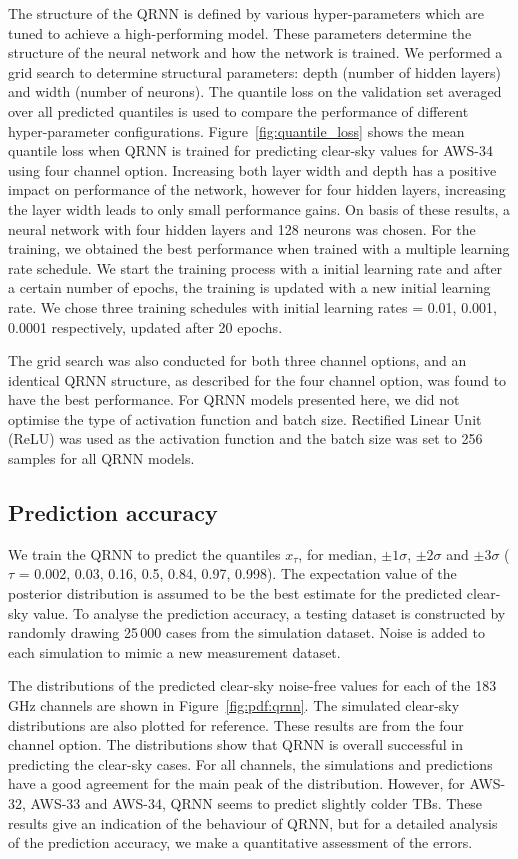 \documentclass[12pt]{article}
\begin{document}
The structure of the QRNN is defined by various hyper-parameters which are
tuned to achieve a high-performing model. These parameters determine the
structure of the neural network and how the network is trained. We performed a
grid search to determine structural parameters: depth (number of hidden layers)
and width (number of neurons). The quantile loss on the validation set averaged
over all predicted quantiles is used to compare the performance of different
hyper-parameter configurations. Figure~\ref{fig:quantile_loss} shows the mean
quantile loss when QRNN is trained for predicting clear-sky values for AWS-34
using four channel option. Increasing both layer width and depth has a positive
impact on performance of the network, however for four hidden layers,
increasing the layer width leads to only small performance gains. On basis of
these results, a neural network with four hidden layers and 128 neurons was
chosen. For the training, we obtained the best performance when trained with a
multiple learning rate schedule. We start the training process with a initial
learning rate and after a certain number of epochs, the training is updated
with a new initial learning rate. We chose three training schedules with
initial learning rates = 0.01, 0.001, 0.0001 respectively, updated after 20
epochs.

The grid search was also conducted for both three channel options, and an identical QRNN structure, as described for the four channel option, was found to have the best performance. For QRNN models presented here, we did not optimise the type of activation function and batch size. Rectified Linear Unit (ReLU) was used as the activation function  and the batch size was set to 256 samples for all QRNN models.   


\subsection{Prediction accuracy}
%
We train the QRNN to predict the quantiles $x_{\tau}$, for median, $\pm 1\sigma$, $\pm 2 \sigma$ and  $\pm 3 \sigma$ ($\tau$ = 0.002, 0.03, 0.16, 0.5, 0.84, 0.97, 0.998). The expectation value of the posterior distribution is assumed to be the best estimate for the predicted clear-sky value. To analyse the prediction accuracy, a testing dataset is constructed by randomly drawing 25\,000 cases from the simulation dataset. Noise is added to each simulation to mimic a new measurement dataset. 

The distributions of the predicted clear-sky noise-free values for each of the
183\, GHz channels are shown in Figure~\ref{fig:pdf:qrnn}. The simulated
clear-sky distributions are also plotted for reference. These results are from
the four channel option. The distributions show that QRNN is overall successful in
predicting the clear-sky cases. For all channels, the simulations and
predictions have a good agreement for the main peak of the distribution.
However, for AWS-32, AWS-33 and AWS-34, QRNN seems to predict slightly colder
TBs. These results give an indication of the behaviour of QRNN, but for a
detailed analysis of the prediction accuracy, we make a quantitative assessment
of the errors.
\end{document}
